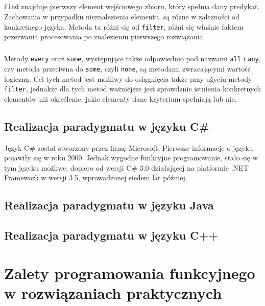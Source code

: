 \documentclass[a4paper,10pt]{report}
\begin{document}
\paragraph{}
\verb|Find| znajduje pierwszy element wejściowego zbioru, który spełnia dany predykat. Zachowania w przypadku nieznalezienia elementu, są różne w zależności od konkretnego języka. Metoda ta różni się od \verb|filter|, różni się właśnie faktem przerwania procesowania po znalezieniu pierwszego rozwiązania.
\paragraph{}
Metody \verb|every| oraz \verb|some|, występujące także odpowiednio pod nazwami \verb|all| i \verb|any|, czy metoda przeciwna do \verb|some|, czyli \verb|none|, są metodami zwracającymi wartość logiczną. Cel tych metod jest możliwy do osiągnięcia także przy użyciu metody \verb|filter|, jednakże dla tych metod ważniejsze jest sprawdznie istnienia konkretnych elementów niż określenie, jakie elementy dane kryterium spełniają lub nie.
\section{Realizacja paradygmatu w języku C\#}
Język C\# został stworzony przez firmę Microsoft. Pierwsze informacje o języku pojawiły się w roku 2000. Jednak wygodne funkcyjne programowanie, stało się w tym języku możliwe, dopiero od wersji C\# 3.0 działającej na platformie .NET Framework w wersji 3.5, wprowadzonej siedem lat później.
\section{Realizacja paradygmatu w języku Java}
\section{Realizacja paradygmatu w języku C++}
\chapter{Zalety programowania funkcyjnego w rozwiązaniach praktycznych}
\end{document}
